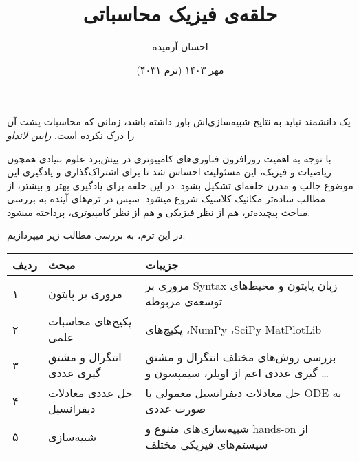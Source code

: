 \documentclass[a4paper]{article}
\title{حلقه‌ی فیزیک محاسباتی\RTLthanks{قدرت گرفته از \XePersian}}
\author{احسان آرمیده}
\date{مهر ۱۴۰۳ (ترم ۴۰۳۱)}
\begin{document}
\maketitle

\prq{}یک دانشمند نباید به نتایج شبیه‌سازی‌اش باور داشته باشد، زمانی که محاسبات پشت آن را درک نکرده است.\plq{}
{\small \itshape رابین لانداو}
\vspace{10pt}

با توجه به اهمیت روزافزون فناوری‌های کامپیوتری در پیش‌برد علوم بنیادی همچون ریاضیات و فیزیک، 
این مسئولیت احساس شد تا برای اشتراک‌گذاری و یادگیری این موضوع جالب و مدرن حلقه‌ای تشکیل بشود.
در این حلقه برای یادگیری بهتر و بیشتر، از مطالب ساده‌تر مکانیک کلاسیک شروع میشود. سپس در ترم‌های
آینده به بررسی مباحث پیچیده‌تر، هم از نظر فیزیکی و هم از نظر کامپیوتری، پرداخته میشود.

در این ترم، به بررسی مطالب زیر میپردازیم:

\begin{center}
    \begin{tabular}{ | m{0.7cm} | m{2cm} | m{6cm} | }
        \hline
        ردیف & مبحث & جزییات \\ \hline
        ۱ & مروری بر پایتون & مروری بر Syntax زبان پایتون و محیط‌های توسعه‌ی مربوطه \\ \hline
        ۲ & پکیج‌های محاسبات علمی & پکیج‌های ،NumPy ،SciPy MatPlotLib \\ \hline
        ۳ & انتگرال و مشتق گیری عددی & بررسی روش‌های مختلف انتگرال و مشتق گیری عددی اعم از اویلر، سیمپسون و \dots \\ \hline
        ۴ & حل عددی معادلات دیفرانسیل & حل معادلات دیفرانسیل معمولی یا ODE به صورت عددی \\ \hline
        ۵ & شبیه‌سازی & شبیه‌سازی‌های متنوع و hands-on از سیستم‌های فیزیکی مختلف \\
        \hline
    \end{tabular}
\end{center}
\end{document}
